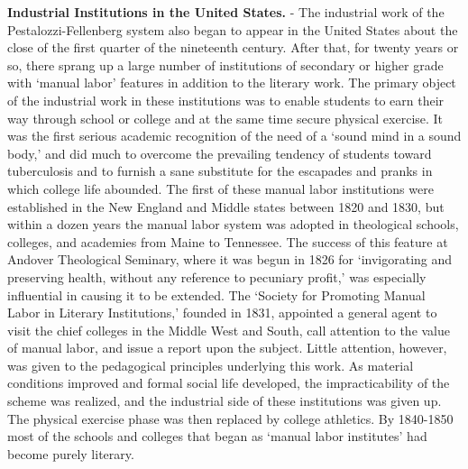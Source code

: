 \documentclass[]{book}
\begin{document}
\textbf{Industrial Institutions in the United States.} - The industrial work of the Pestalozzi-Fellenberg system also began to appear in the United States about the close of the first quarter of the nineteenth century. After that, for twenty years or so, there sprang up a large number of institutions of secondary or higher grade with `manual labor' features in addition to the literary work. The primary object of the industrial work in these institutions was to enable students to earn their way through school or college and at the same time secure physical exercise. It was the first serious academic recognition of the need of a `sound mind in a sound body,' and did much to overcome the prevailing tendency of students toward tuberculosis and to furnish a sane substitute for the escapades and pranks in which college life abounded. The first of these manual labor institutions were established in the New England and Middle states between 1820 and 1830, but within a dozen years the manual labor system was adopted in theological schools, colleges, and academies from Maine to Tennessee. The success of this feature at Andover Theological Seminary, where it was begun in 1826 for `invigorating and preserving health, without any reference to pecuniary profit,' was especially influential in causing it to be extended. The `Society for Promoting Manual Labor in Literary Institutions,' founded in 1831, appointed a general agent to visit the chief colleges in the Middle West and South, call attention to the value of manual labor, and issue a report upon the subject. Little attention, however, was given to the pedagogical principles underlying this work. As material conditions improved and formal social life developed, the impracticability of the scheme was realized, and the industrial side of these institutions was given up. The physical exercise phase was then replaced by college athletics. By 1840-1850 most of the schools and colleges that began as `manual labor institutes' had become purely literary.
\end{document}
